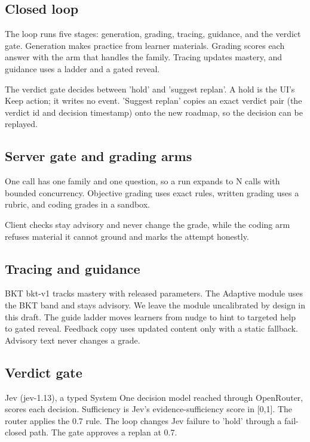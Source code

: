 \documentclass[sn-mathphys,Numbered]{sn-jnl}%
\theoremstyle{thmstyleone}%
\theoremstyle{thmstyletwo}%
\theoremstyle{thmstylethree}%
\begin{document}
\subsection{Closed loop}\label{subsec31}

The loop runs five stages: generation, grading, tracing, guidance, and the verdict gate. Generation makes practice from learner materials. Grading scores each answer with the arm that handles the family. Tracing updates mastery, and guidance uses a ladder and a gated reveal.

The verdict gate decides between 'hold' and 'suggest replan'. A hold is the UI's Keep action; it writes no event. 'Suggest replan' copies an exact verdict pair (the verdict id and decision timestamp) onto the new roadmap, so the decision can be replayed.

\subsection{Server gate and grading arms}\label{subsec32}

One call has one family and one question, so a run expands to N calls with bounded concurrency. Objective grading uses exact rules, written grading uses a rubric, and coding grades in a sandbox.

Client checks stay advisory and never change the grade, while the coding arm refuses material it cannot ground and marks the attempt honestly.

\subsection{Tracing and guidance}\label{subsec33}

BKT bkt-v1 tracks mastery with released parameters. The Adaptive module uses the BKT band and stays advisory. We leave the module uncalibrated by design in this draft. The guide ladder moves learners from nudge to hint to targeted help to gated reveal. Feedback copy uses updated content only with a static fallback. Advisory text never changes a grade.

\subsection{Verdict gate}\label{subsec34}

Jev (jev-1.13), a typed System One decision model reached through OpenRouter, scores each decision. Sufficiency is Jev's evidence-sufficiency score in [0,1]. The router applies the 0.7 rule. The loop changes Jev failure to 'hold' through a fail-closed path. The gate approves a replan at 0.7.
\end{document}
